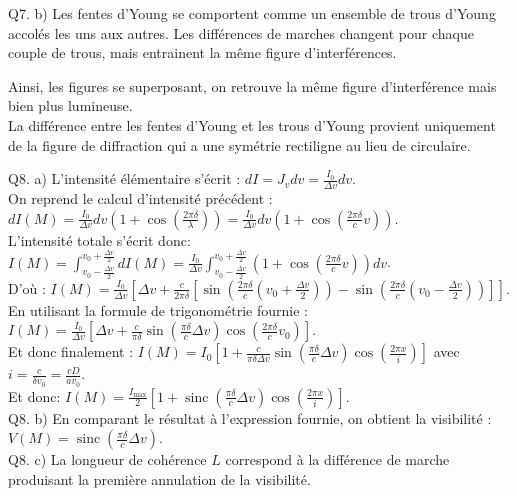 \documentclass[10pt]{article}
\begin{document}
Q7. b) Les fentes d'Young se comportent comme un ensemble de trous d'Young accolés les uns aux autres. Les différences de marches changent pour chaque couple de trous, mais entrainent la même figure d'interférences.

Ainsi, les figures se superposant, on retrouve la même figure d'interférence mais bien plus lumineuse.\\
La différence entre les fentes d'Young et les trous d'Young provient uniquement de la figure de diffraction qui a une symétrie rectiligne au lieu de circulaire.

Q8. a) L'intensité élémentaire s'écrit : \(d I=J_{v} d v=\frac{I_{0}}{\Delta v} d v\).\\
On reprend le calcul d'intensité précédent : \(d I(M)=\frac{I_{0}}{\Delta v} d v\left(1+\cos \left(\frac{2 \pi \delta}{\lambda}\right)\right)=\frac{I_{0}}{\Delta v} d v\left(1+\cos \left(\frac{2 \pi \delta}{c} v\right)\right)\).\\
L'intensité totale s'écrit donc: \(I(M)=\int_{v_{0}-\frac{\Delta v}{2}}^{v_{0}+\frac{\Delta v}{2}} d I(M)=\frac{I_{0}}{\Delta v} \int_{v_{0}-\frac{\Delta v}{2}}^{v_{0}+\frac{\Delta v}{2}}\left(1+\cos \left(\frac{2 \pi \delta}{c} v\right)\right) d v\).\\
D'où : \(I(M)=\frac{I_{0}}{\Delta v}\left[\Delta v+\frac{c}{2 \pi \delta}\left[\sin \left(\frac{2 \pi \delta}{c}\left(v_{0}+\frac{\Delta v}{2}\right)\right)-\sin \left(\frac{2 \pi \delta}{c}\left(v_{0}-\frac{\Delta v}{2}\right)\right)\right]\right]\).\\
En utilisant la formule de trigonométrie fournie : \(I(M)=\frac{I_{0}}{\Delta v}\left[\Delta v+\frac{c}{\pi \delta} \sin \left(\frac{\pi \delta}{c} \Delta v\right) \cos \left(\frac{2 \pi \delta}{c} v_{0}\right)\right]\).\\
Et donc finalement : \(I(M)=I_{0}\left[1+\frac{c}{\pi \delta \Delta v} \sin \left(\frac{\pi \delta}{c} \Delta v\right) \cos \left(\frac{2 \pi x}{i}\right)\right]\) avec \(i=\frac{c}{\delta v_{0}}=\frac{c D}{a v_{0}}\).\\
Et donc: \(I(M)=\frac{I_{\max }}{2}\left[1+\operatorname{sinc}\left(\frac{\pi \delta}{c} \Delta v\right) \cos \left(\frac{2 \pi x}{i}\right)\right]\).\\
Q8. b) En comparant le résultat à l'expression fournie, on obtient la visibilité : \(V(M)=\operatorname{sinc}\left(\frac{\pi \delta}{c} \Delta v\right)\).\\
Q8. c) La longueur de cohérence \(L\) correspond à la différence de marche produisant la première annulation de la visibilité.\\
\end{document}
